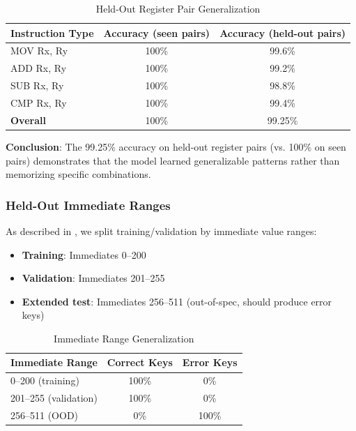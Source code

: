 \documentclass[11pt,a4paper]{article}
\begin{document}
\begin{table}[H]
\centering
\caption{Held-Out Register Pair Generalization}
\label{tab:held-out-registers}
\begin{tabular}{@{}lcc@{}}
\toprule
\textbf{Instruction Type} & \textbf{Accuracy (seen pairs)} & \textbf{Accuracy (held-out pairs)} \\
\midrule
MOV Rx, Ry & 100\% & 99.6\% \\
ADD Rx, Ry & 100\% & 99.2\% \\
SUB Rx, Ry & 100\% & 98.8\% \\
CMP Rx, Ry & 100\% & 99.4\% \\
\midrule
\textbf{Overall} & 100\% & 99.25\% \\
\bottomrule
\end{tabular}
\end{table}

\textbf{Conclusion}: The 99.25\% accuracy on held-out register pairs (vs. 100\% on seen pairs) demonstrates that the model learned generalizable patterns rather than memorizing specific combinations.

\subsubsection{Held-Out Immediate Ranges}

As described in , we split training/validation by immediate value ranges:

\begin{itemize}
    \item \textbf{Training}: Immediates 0--200
    \item \textbf{Validation}: Immediates 201--255
    \item \textbf{Extended test}: Immediates 256--511 (out-of-spec, should produce error keys)
\end{itemize}

\begin{table}[H]
\centering
\caption{Immediate Range Generalization}
\label{tab:held-out-immediates}
\begin{tabular}{@{}lcc@{}}
\toprule
\textbf{Immediate Range} & \textbf{Correct Keys} & \textbf{Error Keys} \\
\midrule
0--200 (training) & 100\% & 0\% \\
201--255 (validation) & 100\% & 0\% \\
256--511 (OOD) & 0\% & 100\% \\
\bottomrule
\end{tabular}
\end{table}
\end{document}
